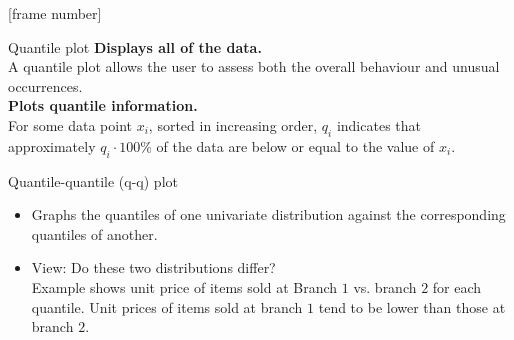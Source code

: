 \documentclass[aspectratio=169,t]{beamer}
\begin{document}
  {
    [frame number]
    \begin{frame}{Quantile plot}
    \textbf{Displays all of the data.}\\
    A quantile plot allows the user to assess both the overall behaviour and unusual occurrences.\\[0.5cm]
    \textbf{Plots quantile information.}\\
    For some data point $x_i$, sorted in increasing order, $q_i$ indicates that approximately $q_i \cdot 100 \%$ of the data are below or equal to the value of $x_i$.\\[0.2cm]
    \centering
    \end{frame}
  }

  {
        \begin{frame}{Quantile-quantile (q-q) plot}
    \begin{itemize}
      \item Graphs the quantiles of one univariate distribution against the corresponding quantiles of another.
      \item View: Do these two distributions differ?\\
      Example shows unit price of items sold at Branch $1$ vs. branch $2$ for each quantile.  Unit prices of items sold at branch $1$ tend to be lower than those at branch $2$.
    \end{itemize}\vspace{0.5cm}
    \centering
    \end{frame}
  }
\end{document}

